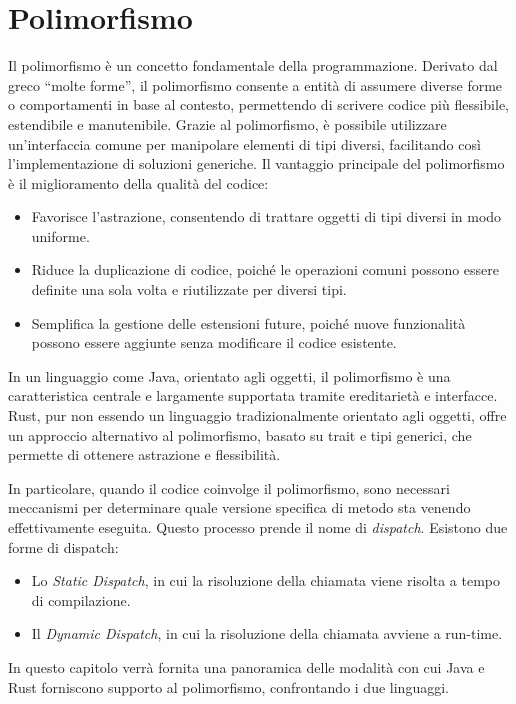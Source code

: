 
\chapter{Polimorfismo}
Il polimorfismo è un concetto fondamentale della programmazione. Derivato dal greco “molte forme”, il polimorfismo consente a entità di assumere diverse forme o comportamenti in base al contesto, permettendo di scrivere codice più flessibile, estendibile e manutenibile. Grazie al polimorfismo, è possibile utilizzare un'interfaccia comune per manipolare elementi di tipi diversi, facilitando così l'implementazione di soluzioni generiche. Il vantaggio principale del polimorfismo è il miglioramento della qualità del codice:
\begin{itemize}
    \item Favorisce l'astrazione, consentendo di trattare oggetti di tipi diversi in modo uniforme.
    \item Riduce la duplicazione di codice, poiché le operazioni comuni possono essere definite una sola volta e riutilizzate per diversi tipi.
    \item Semplifica la gestione delle estensioni future, poiché nuove funzionalità possono essere aggiunte senza modificare il codice esistente.
\end{itemize}
In un linguaggio come Java, orientato agli oggetti, il polimorfismo è una caratteristica centrale e largamente supportata tramite ereditarietà e interfacce. Rust, pur non essendo un linguaggio tradizionalmente orientato agli oggetti, offre un approccio alternativo al polimorfismo, basato su trait e tipi generici, che permette di ottenere astrazione e flessibilità.

In particolare, quando il codice coinvolge il polimorfismo, sono necessari meccanismi per determinare quale versione specifica di metodo sta venendo effettivamente eseguita. Questo processo prende il nome di \textit{dispatch}. Esistono due forme di dispatch: 
\begin{itemize}
    \item Lo \textit{Static Dispatch}, in cui la risoluzione della chiamata viene risolta a tempo di compilazione.
    \item Il \textit{Dynamic Dispatch}, in cui la risoluzione della chiamata avviene a run-time. 
\end{itemize}
In questo capitolo verrà fornita una panoramica delle modalità con cui Java e Rust forniscono supporto al polimorfismo, confrontando i due linguaggi.
